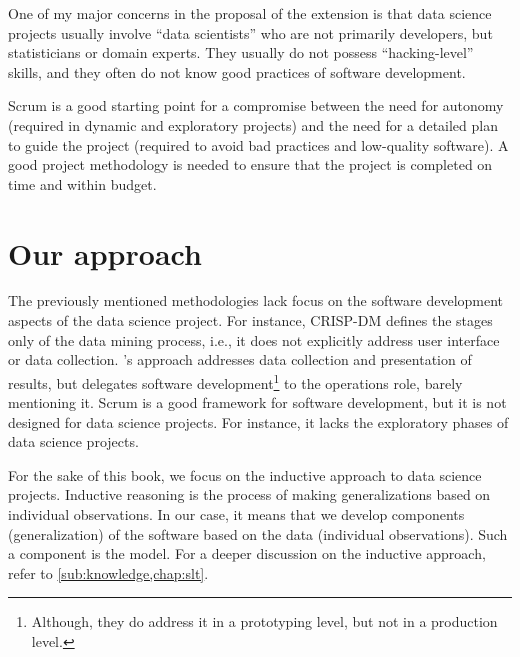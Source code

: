 One of my major concerns in the proposal of the extension is that data science projects
usually involve ``data scientists'' who are not primarily developers, but statisticians or
domain experts.  They usually do not possess ``hacking-level'' skills, and they often do not know
good practices of software development.

Scrum is a good starting point for a compromise between the need for autonomy (required in
dynamic and exploratory projects) and the need for a detailed plan to guide the project
(required to avoid bad practices and low-quality software). A good project methodology is
needed to ensure that the project is completed on time and within budget.

\section{Our approach}
\label{sec:our-approach}

The previously mentioned methodologies lack focus on the software development aspects of
the data science project.  For instance, CRISP-DM defines the stages only of the data
mining process, i.e., it does not explicitly address user interface or data collection.
\citeauthor{Zumel2019}'s approach addresses data collection and presentation of results, but
delegates software development\footnote{Although, they do address it in a prototyping level, but
not in a production level.} to the operations role, barely mentioning it.  Scrum is
a good framework for software development, but it is not designed for data science
projects.  For instance, it lacks the exploratory phases of data science projects.

For the sake of this book, we focus on the inductive approach to data science projects.
Inductive reasoning is the process of making generalizations based on individual
observations.  In our case, it means that we develop components (generalization) of the
software based on the data (individual observations).  Such a component is the
\gls{model}. For a deeper discussion on the inductive approach, refer to
\cref{sub:knowledge,chap:slt}.


